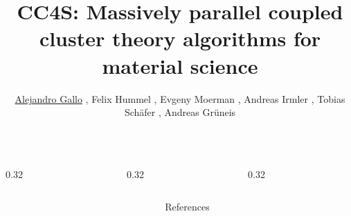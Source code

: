 \documentclass[final]{beamer}
\title{
  CC4S: Massively parallel coupled cluster theory algorithms for material
  science
}
\author{%
    \underline{Alejandro Gallo}%
  , Felix Hummel%
  , Evgeny Moerman%
  , Andreas Irmler%
  , Tobias Schäfer%
  , Andreas Grüneis%
  }
\institute[]{
  Technical University of Vienna
}
\begin{document}
\newcommand{\posterColumnWidth}{0.32\textwidth}
\begin{frame}[fragile]{}
  

  \begin{columns}[T]


    \begin{column}{\posterColumnWidth}
      
      
      
      
    \end{column}

    \nocite{solomonik2014}
    \begin{column}{\posterColumnWidth}
      \newcommand{\scalingWidth}{0.8\textwidth}
      
      \vspace*{-3.0cm}
      
      
    \end{column}


    \begin{column}{\posterColumnWidth}

      \newcommand{\scalingWidth}{0.8\textwidth}
      
      \vspace*{-3.0cm}
      


    \end{column}


  \end{columns}

  \vspace*{1cm}

  \begin{columns}[T]
    \begin{column}{0.32\textwidth}
      
    \end{column}
    \begin{column}{0.64\textwidth}
      \begin{block}{\large References}
        \tiny
        \printbibliography
      \end{block}
    \end{column}
  \end{columns}

\end{frame}
\end{document}
